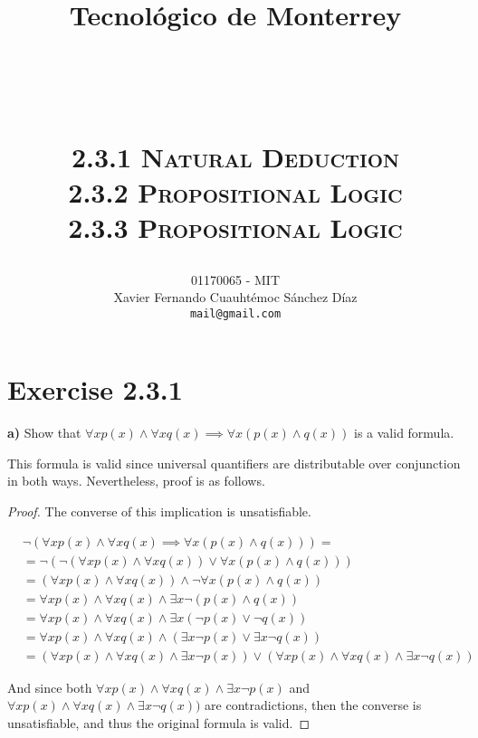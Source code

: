 \documentclass[titlepage, letterpaper, fleqn]{article}
\title{
\vspace{1in}
\textbf{Tecnológico de Monterrey} \\
\vspace{0.5in}
\textmd{\mahclass} \\
\large{\textit{\mahteacher}} \\
\vspace{0.5in}
\textsc{\mahtitle}\\
\textsc{2.3.1 Natural Deduction}\\
\textsc{2.3.2 Propositional Logic}\\
\textsc{2.3.3 Propositional Logic}\\
\author{01170065  - MIT \\
Xavier Fernando Cuauhtémoc Sánchez Díaz \\
\texttt{mail@gmail.com}}
\date{\mahdate}
}
\newcommand{\spacepls}{\vspace{5mm}}
\begin{document}
\begin{titlepage}
\maketitle
\end{titlepage}

%
%

\section{Exercise 2.3.1}

{\large \textbf{a)} Show that \(\forall x p(x) \wedge \forall x q(x) \implies \forall x (p(x) \wedge q(x))\) is a valid formula.}

\spacepls

This formula is valid since universal quantifiers are distributable over conjunction in both ways. Nevertheless, proof is as follows.

\begin{proof}
The converse of this implication is unsatisfiable.

\begin{align*}
& \neg (\forall x p(x) \wedge \forall x q(x) \implies \forall x (p(x) \wedge q(x))) = & \tag*{Converse}
\\ & = \neg (\neg (\forall x p(x) \wedge \forall x q(x)) \vee \forall x (p(x) \wedge q(x))) &\tag*{Material implication}
\\ & = (\forall x p(x) \wedge \forall x q(x)) \wedge \neg \forall x (p(x) \wedge q(x)) &\tag*{de Morgan}
\\ & = \forall x p(x) \wedge \forall x q(x) \wedge \exists x \neg (p(x) \wedge q(x)) &\tag*{Negation of \(\forall\) is \(\exists \neg\)}
\\ & = \forall x p(x) \wedge \forall x q(x) \wedge \exists x (\neg p(x) \vee \neg q(x)) &\tag*{de Morgan}
\\ & = \forall x p(x) \wedge \forall x q(x) \wedge (\exists x \neg p(x) \vee \exists x \neg q(x)) &\tag*{\(\exists\) is distributive over \(\vee\)}
\\ & = (\forall x p(x) \wedge \forall x q(x) \wedge \exists x \neg p(x)) \vee (\forall x p(x) \wedge \forall x q(x) \wedge \exists x \neg q(x)) &\tag*{\(\wedge\) is distributive over \(\vee\)}
\end{align*}

And since both \(\forall x p(x) \wedge \forall x q(x) \wedge \exists x \neg p(x)\) and \(\forall x p(x) \wedge \forall x q(x) \wedge \exists x \neg q(x))\) are contradictions, then the converse is unsatisfiable, and thus the original formula is valid.
\end{proof}
\end{document}

